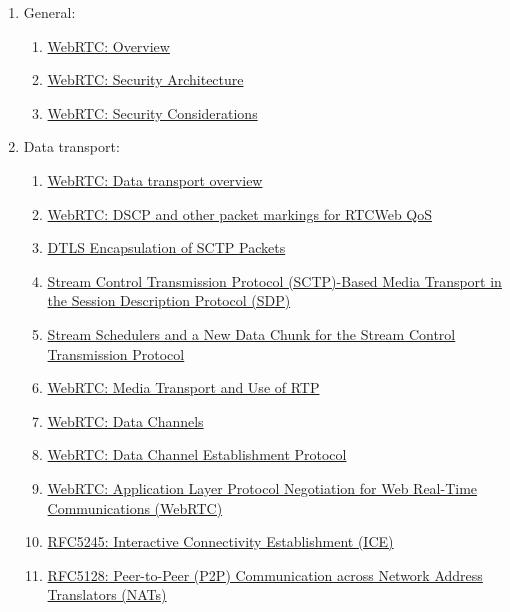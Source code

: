 \documentclass[9pt]{extarticle}
\begin{document}
\begin{multicols}{2}
\begin{enumerate}
\item General:
    \begin{enumerate}
    \item \href{https://tools.ietf.org/html/draft-ietf-rtcweb-overview-13}{WebRTC: Overview}
    \item \href{https://tools.ietf.org/html/draft-ietf-rtcweb-security-arch-11}{WebRTC: Security Architecture}
    \item \href{https://tools.ietf.org/html/draft-ietf-rtcweb-security-08}{WebRTC: Security Considerations}
    \end{enumerate}
\item Data transport:
    \begin{enumerate}
    \item \href{https://tools.ietf.org/html/draft-ietf-rtcweb-transports-08}{WebRTC: Data transport overview}
    \item \href{https://tools.ietf.org/html/draft-ietf-tsvwg-rtcweb-qos-03}{WebRTC: DSCP and other packet markings for RTCWeb QoS}
    \item \href{https://tools.ietf.org/html/draft-ietf-tsvwg-sctp-dtls-encaps-09}{DTLS Encapsulation of SCTP Packets}
    \item \href{https://tools.ietf.org/html/draft-ietf-mmusic-sctp-sdp-14}{Stream Control Transmission Protocol (SCTP)-Based Media Transport in the Session Description Protocol (SDP)}
    \item \href{https://tools.ietf.org/html/draft-ietf-tsvwg-sctp-ndata-02}{Stream Schedulers and a New Data Chunk for the Stream Control Transmission Protocol}
    \item \href{https://tools.ietf.org/html/draft-ietf-rtcweb-rtp-usage-23}{WebRTC: Media Transport and Use of RTP}
    \item \href{https://tools.ietf.org/html/draft-ietf-rtcweb-data-channel-13}{WebRTC: Data Channels}
    \item \href{https://tools.ietf.org/html/draft-ietf-rtcweb-data-protocol-09}{WebRTC: Data Channel Establishment Protocol}
    \item \href{https://tools.ietf.org/html/draft-ietf-rtcweb-alpn-01}{WebRTC: Application Layer Protocol Negotiation for Web Real-Time Communications (WebRTC)}
    \item \href{https://tools.ietf.org/html/rfc5245}{RFC5245: Interactive Connectivity Establishment (ICE)}
    \item \href{https://tools.ietf.org/html/rfc5128}{RFC5128: Peer-to-Peer (P2P) Communication across Network Address Translators (NATs)}

\end{enumerate}
\end{enumerate}
\end{multicols}
\end{document}
